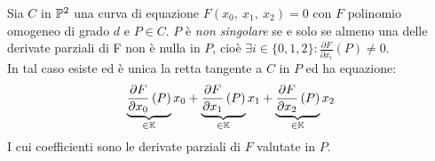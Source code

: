 \begin{proposition}
	Sia $C$ in $\proj[2]{\ }$ una curva di equazione $F\left(x_0,\ x_1,\ x_2\right)=0$ con $F$ polinomio omogeneo di grado $d$ e $P\in C$. $P$ è \textit{non singolare} se e solo se almeno una delle derivate parziali di F non è nulla in $P$, cioè $\exists i\in\{0,1,2\}\colon \frac{\partial{F}}{\partial{x_i}}\left(P\right)\neq 0$.\\
	In tal caso esiste ed è unica la retta tangente a $C$ in $P$ ed ha equazione:
		\begin{equation}
			\underbrace{\frac{\partial{F}}{\partial{x_0}}\left(P\right) }_{\in\mathbb{K}}x_0 + \underbrace{\frac{\partial{F}}{\partial{x_1}}\left(P\right) }_{\in\mathbb{K}}x_1 + \underbrace{\frac{\partial{F}}{\partial{x_2}}\left(P\right) }_{\in\mathbb{K}}x_2 
		\end{equation}
	I cui coefficienti sono le derivate parziali di $F$ valutate in $P$.
\end{proposition}
